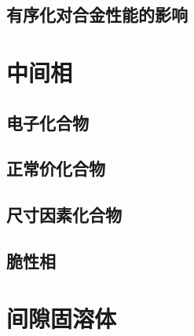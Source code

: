         \subsection{有序化对合金性能的影响}
    \section{中间相}
        \subsection{电子化合物}
        \subsection{正常价化合物}
        \subsection{尺寸因素化合物}
        \subsection{脆性相}
    \section{间隙固溶体}